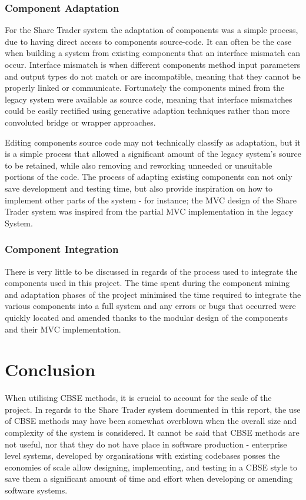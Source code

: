 \documentclass[12pt, a4paper,titlepage]{article}
\begin{document}
\subsubsection{Component Adaptation}
For the Share Trader system the adaptation of components was a simple process,
due to having direct access to components source-code. 
It can often be the case when building a system from existing components that
an interface mismatch can occur. 
Interface mismatch is when different components method input parameters and
output types do not match or are incompatible, meaning that they cannot be
properly linked or communicate.  
Fortunately the components mined from the legacy system were available as
source code, meaning that interface mismatches could be easily rectified
using generative adaption techniques rather than more convoluted bridge or
wrapper approaches.

Editing components source code may not technically classify as adaptation, but
it is a simple process that allowed a significant amount of the legacy system's
source to be retained, while also removing and reworking unneeded or
unsuitable portions of the code. 
The process of adapting existing components can not only save development and
testing time, but also provide inspiration on how to implement other parts of
the system - for instance; the MVC design of the Share Trader system was
inspired from the partial MVC implementation in the legacy System.

\subsubsection{Component Integration}
There is very little to be discussed in regards of the process used to
integrate the components used in this project. 
The time spent during the component mining and adaptation phases of the
project minimised the time required to integrate the various components into a
full system and any errors or bugs that occurred were quickly located and
amended thanks to the modular design of the components and their MVC
implementation.


\section{Conclusion}
When utilising CBSE methods, it is crucial to
account for the scale of the project. 
In regards to the Share Trader system documented
in this report, the use of CBSE methods may have been somewhat overblown when
the overall size and complexity of the system is considered.  
It cannot be
said that CBSE methods are not useful, nor that they do not have place in
software production - enterprise level systems, developed by organisations
with existing codebases posses the economies of scale allow designing,
implementing, and testing in a CBSE style to save them a significant amount of
time and effort when developing or amending software systems. 


\clearpage


\end{document}
